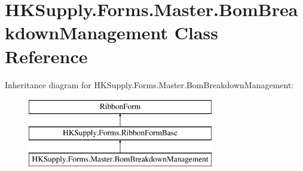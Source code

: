 \hypertarget{class_h_k_supply_1_1_forms_1_1_master_1_1_bom_breakdown_management}{}\section{H\+K\+Supply.\+Forms.\+Master.\+Bom\+Breakdown\+Management Class Reference}
\label{class_h_k_supply_1_1_forms_1_1_master_1_1_bom_breakdown_management}
Inheritance diagram for H\+K\+Supply.\+Forms.\+Master.\+Bom\+Breakdown\+Management\+:\begin{figure}[H]
\begin{center}
\leavevmode
\includegraphics[height=3.000000cm]{class_h_k_supply_1_1_forms_1_1_master_1_1_bom_breakdown_management}
\end{center}
\end{figure}
